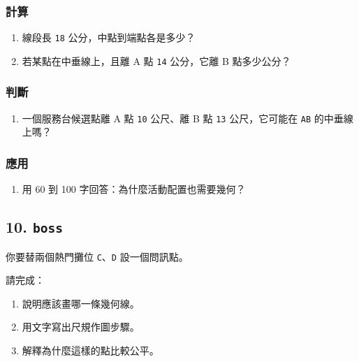 \documentclass[
  chinese,
  12pt,
  a4paper,
  oneside]{article}
\providecommand{\tightlist}{%
  \setlength{\itemsep}{0pt}\setlength{\parskip}{0pt}}
\begin{document}
\subsubsection{計算}\label{ux8a08ux7b97-2}

\begin{enumerate}
\def\labelenumi{\arabic{enumi}.}
\setcounter{enumi}{2}
\tightlist
\item
  線段長 \texttt{18} 公分，中點到端點各是多少？
\item
  若某點在中垂線上，且離 A 點 \texttt{14} 公分，它離 B 點多少公分？
\end{enumerate}

\subsubsection{判斷}\label{ux5224ux65b7-3}

\begin{enumerate}
\def\labelenumi{\arabic{enumi}.}
\setcounter{enumi}{4}
\tightlist
\item
  一個服務台候選點離 A 點 \texttt{10} 公尺、離 B 點 \texttt{13}
  公尺，它可能在 \texttt{AB} 的中垂線上嗎？
\end{enumerate}

\subsubsection{應用}\label{ux61c9ux7528-2}

\begin{enumerate}
\def\labelenumi{\arabic{enumi}.}
\setcounter{enumi}{5}
\tightlist
\item
  用 60 到 100 字回答：為什麼活動配置也需要幾何？
\end{enumerate}

\subsection{\texorpdfstring{10. \texttt{boss}}{10. boss}}\label{boss-2}

你要替兩個熱門攤位 \texttt{C}、\texttt{D} 設一個問訊點。

請完成：

\begin{enumerate}
\def\labelenumi{\arabic{enumi}.}
\tightlist
\item
  說明應該畫哪一條幾何線。
\item
  用文字寫出尺規作圖步驟。
\item
  解釋為什麼這樣的點比較公平。
\end{enumerate}
\end{document}

